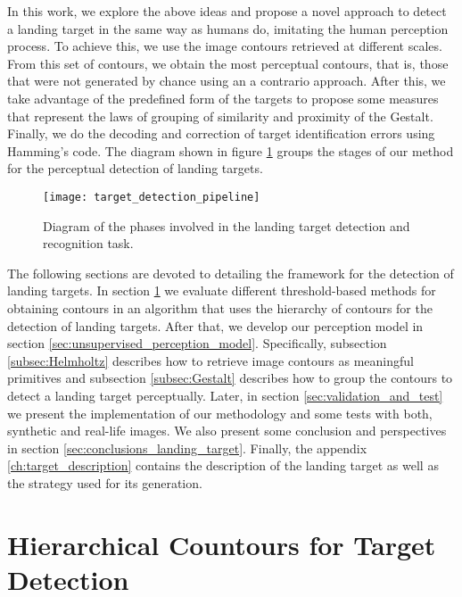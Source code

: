 In this work, we explore the above ideas and propose a novel approach to detect a landing target in the same way as humans do, imitating the human perception process. To achieve this, we use the image contours retrieved at different scales. From this set of contours, we obtain the most perceptual contours, that is, those that were not generated by chance using an a contrario approach. After this, we take advantage of the predefined form of the targets to propose some measures that represent the laws of grouping of similarity and proximity of the Gestalt. Finally, we do the decoding and correction of target identification errors using Hamming's code. The diagram shown in figure \ref{fig:target_detection_pipeline} groups the stages of our method for the perceptual detection of landing targets.

\begin{figure}[!ht]
    \centering
    \texttt{[image: target\_detection\_pipeline]}        
    \caption{Diagram of the phases involved in the landing target detection and recognition task.}\label{fig:target_detection_pipeline}
\end{figure}

The following sections are devoted to detailing the framework for the detection of landing targets. In section \ref{sec:hierarchical_target_detection} we evaluate different threshold-based methods for obtaining contours in an algorithm that uses the hierarchy of contours for the detection of landing targets. After that, we develop our perception model in section \ref{sec:unsupervised_perception_model}. Specifically, subsection \ref{subsec:Helmholtz} describes how to retrieve image contours as meaningful primitives and subsection \ref{subsec:Gestalt} describes how to group the contours to detect a landing target perceptually.  Later, in section \ref{sec:validation_and_test} we present the implementation of our methodology and some tests with both, synthetic and real-life images. We also present some conclusion and perspectives in section \ref{sec:conclusions_landing_target}. Finally, the appendix \ref{ch:target_description} contains the description of the landing target as well as the strategy used for its generation.


\section{Hierarchical Countours for Target Detection}\label{sec:hierarchical_target_detection}

